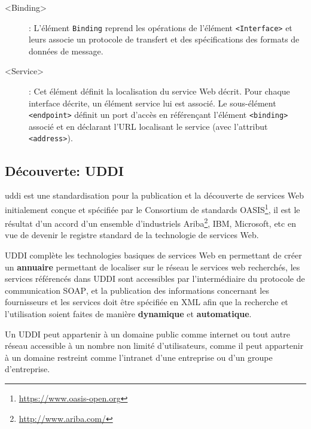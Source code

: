   \SpecialItem
  \renewcommand{\descriptionlabel}[1]{\hspace{1.5cm}\texttt{#1}}
  \begin{description}
  \item[<Binding>]: L'élément \texttt{Binding} reprend les opérations
    de l'élément \texttt{<Interface>} et leurs associe un protocole de
    transfert et des spécifications des formats de données de message.

  \item[<Service>]: Cet élément définit la localisation du service Web
    décrit. Pour chaque interface décrite, un élément service lui est
    associé. Le sous-élément \texttt{<endpoint>} définit un port
    d’accès en référençant l'élément \texttt{<binding>} associé et en
    déclarant l'\textsc{URL} localisant le service (avec l'attribut
    \texttt{<address>}).
  \end{description}
  \newpage
  \subsection{Découverte: UDDI}
  \label{sec:uddi}
  \acrshort{uddi} \cite{clement2004uddi} est une standardisation pour
  la publication et la découverte de services Web initialement conçue
  et spécifiée par le Consortium de standards
  OASIS\footnote{\url{https://www.oasis-open.org}}, il est le résultat
  d'un accord d'un ensemble d'industriels
  Ariba\footnote{\url{http://www.ariba.com/}}, IBM, Microsoft, etc en
  vue de devenir le registre standard de la technologie de services
  Web.

  \textsc{UDDI} complète les technologies basiques de services Web en
  permettant de créer un \textbf{annuaire} permettant de localiser sur
  le réseau le services web recherchés, les services référencés dans
  \textsc{UDDI} sont accessibles par l'intermédiaire du protocole de
  communication \textsc{SOAP}, et la publication des informations
  concernant les fournisseurs et les services doit être spécifiée en
  \textsc{XML} afin que la recherche et l'utilisation soient faites de
  manière \textbf{dynamique} et \textbf{automatique}.

  Un \textsc{UDDI} peut appartenir à un domaine public comme internet
  ou tout autre réseau accessible à un nombre non limité
  d'utilisateurs, comme il peut appartenir à un domaine restreint
  comme l'intranet d'une entreprise ou d'un groupe d'entreprise.


